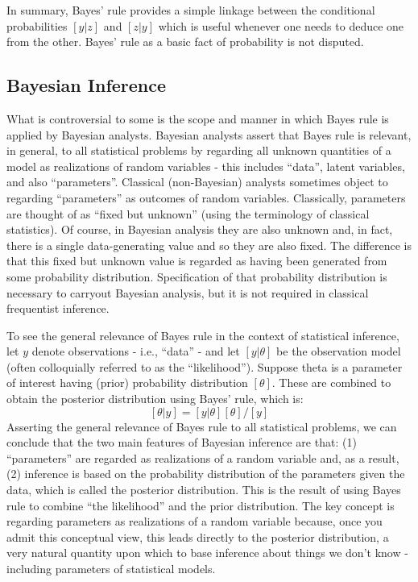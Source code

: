 In summary, Bayes' rule provides a simple linkage between the
conditional probabilities $[y|z]$ and $[z|y]$ which is useful whenever
one needs to deduce one from the other. 
Bayes' rule as a basic fact of probability is not disputed. 


\subsection{Bayesian Inference}


What is controversial to some is the scope and manner in which Bayes
rule is applied by Bayesian analysts. Bayesian analysts assert that
Bayes rule is relevant, in general, to all statistical problems by
regarding all unknown quantities of a model as realizations of random
variables - this includes ``data'', latent variables, and also
``parameters''. Classical (non-Bayesian) analysts sometimes object to
regarding ``parameters'' as outcomes of random variables. Classically,
parameters are thought of as ``fixed but unknown'' (using the
terminology of classical statistics). Of course, in Bayesian analysis
they are also unknown and, in fact, there is a single data-generating
value and so they are also fixed. The difference is that this fixed
but unknown value is regarded as having been generated from some
probability distribution. Specification of that probability
distribution is necessary to carryout Bayesian analysis, but it is not
required in classical frequentist inference. 


To see the general relevance of Bayes rule in the context of
statistical inference, let $y$ denote observations - i.e., ``data'' -
and let $[y|\theta]$ be the observation model (often colloquially
referred to as the ``likelihood'').  Suppose theta is a parameter of
interest having (prior) probability distribution $[\theta]$. These are
combined to obtain the posterior distribution using Bayes' rule, which
is:
\[
 [\theta|y]= [y|\theta][\theta]/[y]
\]
Asserting the general relevance of Bayes rule to all statistical
problems, we can conclude that the two main features of Bayesian
inference are that: (1) ``parameters'' are regarded as realizations of
a random variable and, as a result, (2) inference is based on the
probability distribution of the parameters given the data, which is
called the posterior distribution. This is the result of using Bayes
rule to combine ``the likelihood'' and the prior distribution.  The
key concept is regarding parameters as realizations of a random
variable because, once you admit this conceptual view, this leads
directly to the posterior distribution, a very natural quantity upon
which to base inference about things we don't know -  including parameters of statistical models.  


